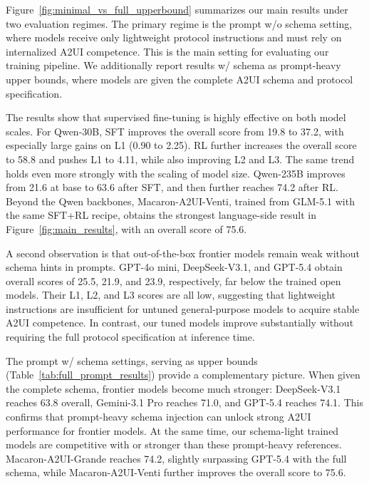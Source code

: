 Figure~\ref{fig:minimal_vs_full_upperbound} summarizes our main results under two evaluation regimes. The primary regime is the prompt w/o schema setting, where models receive only lightweight protocol instructions and must rely on internalized A2UI competence. This is the main setting for evaluating our training pipeline. We additionally report results w/ schema as prompt-heavy upper bounds, where models are given the complete A2UI schema and protocol specification.

The results show that supervised fine-tuning is highly effective on both model scales. For Qwen-30B, SFT improves the overall score from 19.8 to 37.2, with especially large gains on L1 (0.90 to 2.25). RL further increases the overall score to 58.8 and pushes L1 to 4.11, while also improving L2 and L3. The same trend holds even more strongly with the scaling of model size. Qwen-235B improves from 21.6 at base to 63.6 after SFT, and then further reaches 74.2 after RL. Beyond the Qwen backbones, Macaron-A2UI-Venti, trained from GLM-5.1 with the same SFT+RL recipe, obtains the strongest language-side result in Figure~\ref{fig:main_results}, with an overall score of 75.6.

A second observation is that out-of-the-box frontier models remain weak without schema hints in prompts. GPT-4o mini, DeepSeek-V3.1, and GPT-5.4 obtain overall scores of 25.5, 21.9, and 23.9, respectively, far below the trained open models. Their L1, L2, and L3 scores are all low, suggesting that lightweight instructions are insufficient for untuned general-purpose models to acquire stable A2UI competence. In contrast, our tuned models improve substantially without requiring the full protocol specification at inference time.

The prompt w/ schema settings, serving as upper bounds (Table~\ref{tab:full_prompt_results}) provide a complementary picture. When given the complete schema, frontier models become much stronger: DeepSeek-V3.1 reaches 63.8 overall, Gemini-3.1 Pro reaches 71.0, and GPT-5.4 reaches 74.1. This confirms that prompt-heavy schema injection can unlock strong A2UI performance for frontier models. 
At the same time, our schema-light trained models are competitive with or stronger than these prompt-heavy references. Macaron-A2UI-Grande reaches 74.2, slightly surpassing GPT-5.4 with the full schema, while Macaron-A2UI-Venti further improves the overall score to 75.6.

